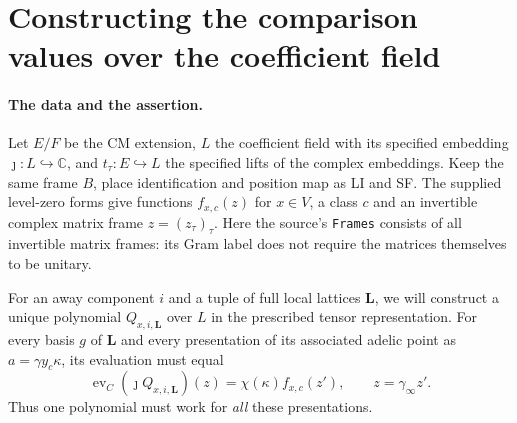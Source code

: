 \section{Constructing the comparison values over the coefficient field}
\label{sec:value-existence}


\paragraph{The data and the assertion.}
Let $E/F$ be the CM extension, $L$ the coefficient field with its
specified embedding $\jmath:L\hookrightarrow\mathbb C$, and
$t_\tau:E\hookrightarrow L$ the specified lifts of the complex
embeddings. Keep the same frame $B$, place identification and position
map as LI and SF. The supplied level-zero forms give functions
$f_{x,c}(z)$ for $x\in V$, a class $c$ and an invertible complex
matrix frame $z=(z_\tau)_\tau$. Here the source's
\texttt{Frames} consists of all invertible matrix frames: its Gram
label does not require the matrices themselves to be unitary.

For an away component $i$ and a tuple of full local lattices
$\mathbf L$, we will construct a unique polynomial
$Q_{x,i,\mathbf L}$ over $L$ in the prescribed tensor representation.
For every basis $g$ of $\mathbf L$ and every presentation of its
associated adelic point as $a=\gamma y_c\kappa$, its evaluation must
equal
\[
 \operatorname{ev}_C(\jmath Q_{x,i,\mathbf L})(z)
       =\chi(\kappa)f_{x,c}(z'),\qquad z=\gamma_\infty z'.
                                                        \tag{VE.1}
\]
Thus one polynomial must work for \emph{all} these presentations.

